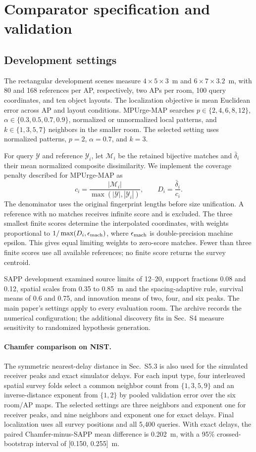\documentclass[10pt]{article}
\newcommand{\Y}{\mathcal Y}
\begin{document}
\section{Comparator specification and validation}
\subsection{Development settings}
The rectangular development scenes measure $4\times5\times3$~m and $6\times7\times3.2$~m, with 80 and 168 references per AP, respectively, two APs per room, 100 query coordinates, and ten object layouts. The localization objective is mean Euclidean error across AP and layout conditions. MPUrge-MAP searches $p\in\{2,4,6,8,12\}$, $\alpha\in\{0.3,0.5,0.7,0.9\}$, normalized or unnormalized local patterns, and $k\in\{1,3,5,7\}$ neighbors in the smaller room. The selected setting uses normalized patterns, $p=2$, $\alpha=0.7$, and $k=3$.

For query $\Y$ and reference $\Y_i$, let $\mathcal M_i$ be the retained bijective matches and $\bar\delta_i$ their mean normalized composite dissimilarity. We implement the coverage penalty described for MPUrge-MAP as
\begin{equation}
c_i=\frac{|\mathcal M_i|}{\max(|\Y|,|\Y_i|)},\qquad
D_i=\frac{\bar\delta_i}{c_i}.
\end{equation}
The denominator uses the original fingerprint lengths before size unification. A reference with no matches receives infinite score and is excluded. The three smallest finite scores determine the interpolated coordinates, with weights proportional to $1/\max(D_i,\epsilon_{\rm mach})$, where $\epsilon_{\rm mach}$ is double-precision machine epsilon. This gives equal limiting weights to zero-score matches. Fewer than three finite scores use all available references; no finite score returns the survey centroid.

SAPP development examined source limits of 12--20, support fractions 0.08 and 0.12, spatial scales from 0.35 to 0.85~m and the spacing-adaptive rule, survival means of 0.6 and 0.75, and innovation means of two, four, and six peaks. The main paper's settings apply to every evaluation room. The archive records the numerical configuration; the additional discovery fits in Sec.~S4 measure sensitivity to randomized hypothesis generation.

\paragraph{Chamfer comparison on NIST.}
The symmetric nearest-delay distance in Sec.~S5.3 is also used for the simulated receiver peaks and exact simulator delays. For each input type, four interleaved spatial survey folds select a common neighbor count from $\{1,3,5,9\}$ and an inverse-distance exponent from $\{1,2\}$ by pooled validation error over the six room/AP maps. The selected settings are three neighbors and exponent one for receiver peaks, and nine neighbors and exponent one for exact delays. Final localization uses all survey positions and all 5,400 queries. With exact delays, the paired Chamfer-minus-SAPP mean difference is 0.202~m, with a 95\% crossed-bootstrap interval of [0.150, 0.255]~m.
\end{document}
